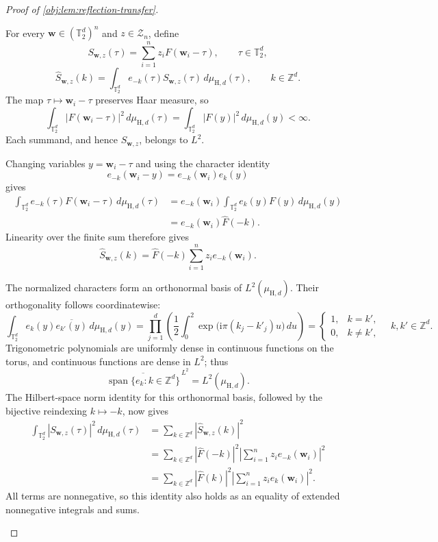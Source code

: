 \begin{proof}[Proof of \cref{obj:lem:reflection-transfer}]
\begin{enumerate}
For every
\(\mathbf w\in(\mathbb T_2^d)^n\) and \(z\in\mathcal Z_n\), define
\[
S_{\mathbf w,z}(\tau)
=\sum_{i=1}^n z_i F(\mathbf w_i-\tau),
\qquad \tau\in\mathbb T_2^d,
\]
\[
\widehat S_{\mathbf w,z}(k)
=\int_{\mathbb T_2^d}
e_{-k}(\tau)S_{\mathbf w,z}(\tau)
\,d\mu_{\mathrm H,d}(\tau),
\qquad k\in\mathbb Z^d.
\]
The map \(\tau\mapsto\mathbf w_i-\tau\) preserves Haar measure, so
\[
\int_{\mathbb T_2^d}|F(\mathbf w_i-\tau)|^2
\,d\mu_{\mathrm H,d}(\tau)
=\int_{\mathbb T_2^d}|F(y)|^2\,d\mu_{\mathrm H,d}(y)<\infty.
\]
Each summand, and hence \(S_{\mathbf w,z}\), belongs to \(L^2\).

Changing variables \(y=\mathbf w_i-\tau\) and using the character
identity
\[
e_{-k}(\mathbf w_i-y)=e_{-k}(\mathbf w_i)e_k(y)
\]
gives
\[
\begin{aligned}
\int_{\mathbb T_2^d}
e_{-k}(\tau)F(\mathbf w_i-\tau)\,d\mu_{\mathrm H,d}(\tau)
&=e_{-k}(\mathbf w_i)
  \int_{\mathbb T_2^d}e_k(y)F(y)\,d\mu_{\mathrm H,d}(y)\\
&=e_{-k}(\mathbf w_i)\widehat F(-k).
\end{aligned}
\]
Linearity over the finite sum therefore gives
\[
\widehat S_{\mathbf w,z}(k)
=\widehat F(-k)\sum_{i=1}^n z_i e_{-k}(\mathbf w_i).
\]

The normalized characters form an orthonormal basis of
\(L^2(\mu_{\mathrm H,d})\). Their orthogonality follows coordinatewise:
\[
\int_{\mathbb T_2^d}
e_k(y)\overline{e_{k'}(y)}\,d\mu_{\mathrm H,d}(y)
=
\prod_{j=1}^d
\left(\frac12\int_0^2
  \exp\bigl(\mathrm i\pi(k_j-k'_j)u\bigr)\,du\right)
=
\begin{cases}
1,&k=k',\\
0,&k\neq k',
\end{cases}
\quad k,k'\in\mathbb Z^d.
\]
Trigonometric polynomials are uniformly dense in continuous functions
on the torus, and continuous functions are dense in \(L^2\); thus
\[
\overline{\operatorname{span}\{e_k:k\in\mathbb Z^d\}}^{\,L^2}
=L^2(\mu_{\mathrm H,d}).
\]
The Hilbert-space norm identity for this orthonormal basis, followed by
the bijective reindexing \(k\mapsto-k\), now gives
\[
\begin{aligned}
\int_{\mathbb T_2^d}|S_{\mathbf w,z}(\tau)|^2
\,d\mu_{\mathrm H,d}(\tau)
&=\sum_{k\in\mathbb Z^d}|\widehat S_{\mathbf w,z}(k)|^2\\
&=\sum_{k\in\mathbb Z^d}
|\widehat F(-k)|^2
\left|\sum_{i=1}^n z_i e_{-k}(\mathbf w_i)\right|^2\\
&=\sum_{k\in\mathbb Z^d}
|\widehat F(k)|^2
\left|\sum_{i=1}^n z_i e_k(\mathbf w_i)\right|^2.
\end{aligned}
\]
All terms are nonnegative, so this identity also holds as an equality
of extended nonnegative integrals and sums.


\end{enumerate}
\end{proof}
